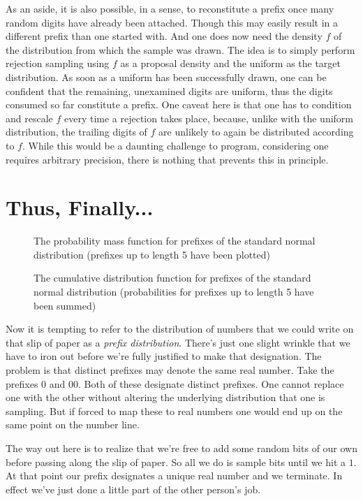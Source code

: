 \documentclass{article}
\begin{document}
As an aside, it is also possible, in a sense, to reconstitute a prefix once many random digits have already been attached. Though this may easily result in a different prefix than one started with. And one does now need the density $f$ of the distribution from which the sample was drawn. The idea is to simply perform rejection sampling using $f$ as a proposal density and the uniform as the target distribution. As soon as a uniform has been successfully drawn, one can be confident that the remaining, unexamined digits are uniform, thus the digits consumed so far constitute a prefix. One caveat here is that one has to condition and rescale $f$ every time a rejection takes place, because, unlike with the uniform distribution, the trailing digits of $f$ are unlikely to again be distributed according to $f$. While this would be a daunting challenge to program, considering one requires arbitrary precision, there is nothing that prevents this in principle.

\section{Thus, Finally...}

\begin{figure}
    \centering
    
    \caption{The probability mass function for prefixes of the standard normal distribution (prefixes up to length 5 have been plotted)}
    \label{fig:normal_bin_pmf_full}\vspace{2em}
    
    
    \caption{The cumulative distribution function for prefixes of the standard normal distribution (probabilities for prefixes up to length 5 have been summed)}
    \label{fig:normal_bin_cdf_full}
\end{figure}

Now it is tempting to refer to the distribution of numbers that we could write on that slip of paper as a \textit{prefix distribution}. There's just one slight wrinkle that we have to iron out before we're fully justified to make that designation. The problem is that distinct prefixes may denote the same real number. Take the prefixes $0$ and $00$. Both of these designate distinct prefixes. One cannot replace one with the other without altering the underlying distribution that one is sampling. But if forced to map these to real numbers one would end up on the same point on the number line.

The way out here is to realize that we're free to add some random bits of our own before passing along the slip of paper. So all we do is sample bits until we hit a $1$. At that point our prefix designates a unique real number and we terminate. In effect we've just done a little part of the other person's job. 
\end{document}
